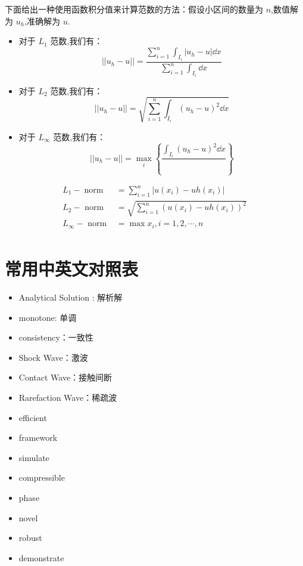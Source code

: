\documentclass{book}
\begin{document}
下面给出一种使用函数积分值来计算范数的方法：假设小区间的数量为 $n$,数值解为 $u_h$,准确解为 $u$.
\begin{itemize}
    \item 对于 $L_1$ 范数,我们有：
          \begin{equation}
              || u_{h}-u || = \frac{\sum_{i=1}^{n}\int_{I_i}|u_{h}-u|\dd x }{\sum_{i=1}^{n}\int_{I_i}\dd x}
          \end{equation}

    \item 对于 $L_2$ 范数,我们有：
          \begin{equation}
              || u_{h}-u || = \sqrt{\sum_{i=1}^{n}\int_{I_i}\left(u_{h}-u\right)^2\dd x}
          \end{equation}
    \item 对于 $L_\infty$ 范数,我们有：
          \begin{equation}
              || u_{h}-u || = \max_i \left\{\frac{\int_{I_i}\left(u_{h}-u\right)^2\dd x}{} \right\}
          \end{equation}
\end{itemize}


\begin{equation}
    \begin{aligned}
        L_{1}-\operatorname{norm} & =\sum_{i=1}^{n}\left|u\left(x_{i}\right)-u h\left(x_{i}\right)\right|            \\
        L_{2}-\text { norm }      & =\sqrt{\sum_{i=1}^{n}\left(u\left(x_{i}\right)-u h\left(x_{i}\right)\right)^{2}} \\
        L_{\infty}-\text { norm } & =\max x_i,i=1,2,\cdots,n                                                         \\
    \end{aligned}
\end{equation}


\section{常用中英文对照表}
\begin{itemize}
    \item Analytical Solution : 解析解
    \item monotone: 单调
    \item consistency：一致性
    \item Shock Wave：激波
    \item Contact Wave：接触间断
    \item Rarefaction Wave：稀疏波
    \item efficient
    \item framework
    \item simulate
    \item compressible
    \item phase
    \item novel
    \item robust
    \item demonstrate
\end{itemize}
\end{document}
